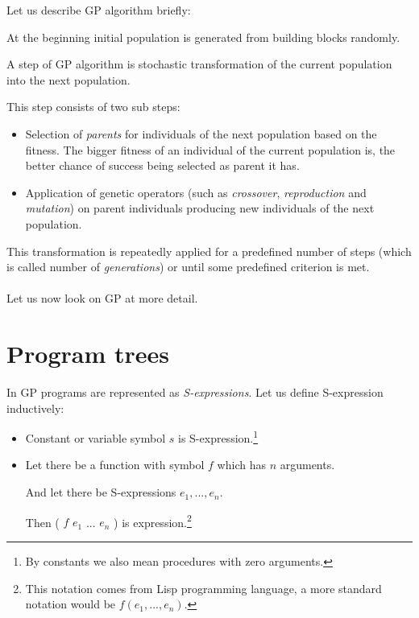 \documentclass[12pt,a4paper]{report}
\newcommand{\Lets}{Let us\xspace}
\begin{document}
\Lets describe GP algorithm briefly:

At the beginning initial population is generated from building blocks randomly.

A step of GP algorithm is stochastic transformation of the current population into 	
the next population.

This step consists of two sub steps:
\begin{itemize} 
	\item Selection of \textit{parents} for individuals of the next population based on the fitness.
	      The bigger fitness of an individual of the current population is, 
	      the better chance of success being selected as parent it has.  
	\item Application of genetic operators (such as \textit{crossover}, 
	      \textit{reproduction} and \textit{mutation}) 
		  on parent individuals producing new individuals of the next population.  
\end{itemize}	  
This transformation is repeatedly applied for a predefined number of steps (which is called 
number of \textit{generations}) or until some predefined criterion is met.	
\\\\
\Lets now look on GP at more detail. 


\section{Program trees}
\label{GP-prog-trees}

In GP programs are represented as \textit{S-expressions}. 
\Lets define S-expression inductively:

\begin{samepage}
\begin{itemize}
	\item Constant or variable symbol $s$ is S-expression.\footnote{
	      By constants we also mean procedures with zero arguments.}
	\item Let there be a function with symbol $f$ which has $n$ arguments.
	 
	      And let there be S-expressions $e_{1}, ..., e_{n}$. 
	      
	      Then ( $f$ $e_{1}$ ... $e_{n}$ ) is expression.\footnote{
	      This notation comes from Lisp programming language, 
	      a more standard notation would be $f(e_{1}, ... ,e_{n})$.}   
\end{itemize}
\end{samepage}
\end{document}
